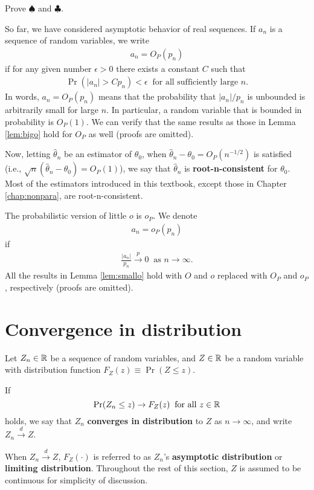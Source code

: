 \documentclass[11pt, A4paper, openany, uplatex]{book}
\begin{document}
\begin{framed}
	\begin{exercise}\upshape
		Prove $\spadesuit$ and $\clubsuit$.
	\end{exercise}
\end{framed}

So far, we have considered asymptotic behavior of real sequences.
If $a_n$ is a sequence of random variables, we write
\begin{align*}
	a_n = O_P(p_n)
\end{align*}
if for any given number $\epsilon > 0$ there exists a constant $C$ such that 
\begin{align*}
	\Pr(|a_n| > C p_n) < \epsilon \;\; \text{for all sufficiently large $n$.}
\end{align*}
In words, $a_n = O_P(p_n)$ means that the probability that $|a_n|/p_n$ is unbounded is arbitrarily small for large $n$.
In particular, a random variable that is bounded in probability is $O_P(1)$.
We can verify that the same results as those in Lemma \ref{lem:bigo} hold for $O_P$ as well (proofs are omitted).

Now, letting $\hat \theta_n$ be an estimator of $\theta_0$, when $\hat \theta_n - \theta_0 = O_P(n^{-1/2})$ is satisfied (i.e., $\sqrt{n}(\hat \theta_n - \theta_0) = O_P(1)$), we say that $\hat \theta_n$ is \textbf{root-n-consistent} for $\theta_0$.
Most of the estimators introduced in this textbook, except those in Chapter \ref{chap:nonpara}, are root-n-consistent.

The probabilistic version of little $o$ is $o_P$.
We denote
\begin{align*}
	a_n = o_P(p_n)
\end{align*}
if 
\begin{align*}
	\frac{|a_n|}{p_n} \overset{p}{\to} 0 \;\; \text{as $n \to \infty$}.
\end{align*}
All the results in Lemma \ref{lem:smallo} hold with $O$ and $o$ replaced with $O_P$ and $o_P$, respectively (proofs are omitted).

\section{Convergence in distribution}\label{subsec:indist}

Let $Z_n \in \mathbb{R}$ be a  sequence of random variables, and $Z \in \mathbb{R}$ be a random variable with distribution function  $F_Z(z) \equiv \Pr(Z \le z)$.
\begin{definition}
If
\[
	\Pr(Z_n \le z) \to F_Z(z) \;\; \text{for all $z \in \mathbb{R}$}
\]
holds, we say that $Z_n$ \textbf{converges in distribution} to $Z$ as $n \to \infty$, and write $Z_n \overset{d}{\to} Z$.
\end{definition}
When $Z_n \overset{d}{\to} Z$, $F_Z(\cdot)$ is referred to as $Z_n$'s \textbf{asymptotic distribution} or \textbf{limiting distribution}.
Throughout the rest of this section, $Z$ is assumed to be continuous for simplicity of discussion.
\end{document}
